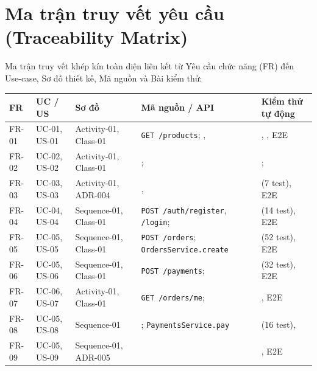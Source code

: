 \documentclass[12pt, a4paper]{article}
\begin{document}
\section{Ma trận truy vết yêu cầu (Traceability Matrix)}\label{sec:rtm}
Ma trận truy vết khép kín toàn diện liên kết từ Yêu cầu chức năng (FR) đến Use-case, Sơ đồ thiết kế, Mã nguồn và Bài kiểm thử:

\begin{table}[!htbp]\centering\scriptsize\setlength{\tabcolsep}{3pt}
\begin{tabularx}{\textwidth}{@{}l L{1.9cm} L{1.9cm} L{3.4cm} X@{}}
\toprule \textbf{FR} & \textbf{UC / US} & \textbf{Sơ đồ} & \textbf{Mã nguồn / API} & \textbf{Kiểm thử tự động} \\ \midrule
FR-01 & UC-01, US-01 & Activity-01, Class-01 & \texttt{GET /products}; ,  & , , E2E \\
FR-02 & UC-02, US-02 & Activity-01, Class-01 & ;  & ;  \\
FR-03 & UC-03, US-03 & Activity-01, ADR-004 & ,  &  (7 test), E2E \\
FR-04 & UC-04, US-04 & Sequence-01, Class-01 & \texttt{POST /auth/register}, \texttt{/login};  &  (14 test), E2E \\
FR-05 & UC-05, US-05 & Sequence-01, Class-01 & \texttt{POST /orders}; \texttt{OrdersService.create} &  (52 test), E2E \\
FR-06 & UC-05, US-06 & Sequence-01, Class-01 & \texttt{POST /payments};  &  (32 test), E2E \\
FR-07 & UC-06, US-07 & Activity-01, Class-01 & \texttt{GET /orders/me};  & , E2E \\
FR-08 & UC-05, US-08 & Sequence-01 & ; \texttt{PaymentsService.pay} &  (16 test),  \\
FR-09 & UC-05, US-09 & Sequence-01, ADR-005 &  & , E2E \\

\end{tabularx}
\end{table}
\end{document}
